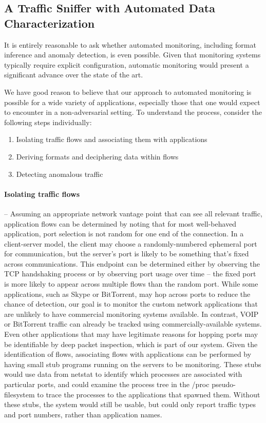 \subsection{A Traffic Sniffer with Automated Data Characterization}

It is entirely reasonable to ask whether automated monitoring,
including format inference and anomaly detection, is even
possible. Given that monitoring systems typically require explicit
configuration, automatic monitoring would present a significant
advance over the state of the art.

We have good reason to believe that our approach to automated
monitoring is possible for a wide variety of applications, especially
those that one would expect to encounter in a non-adversarial setting.
To understand the process, consider the following steps individually:

\begin{enumerate}
\item Isolating traffic flows and associating them with applications
\item Deriving formats and deciphering data within flows
\item Detecting anomalous traffic
\end{enumerate}

\paragraph*{Isolating traffic flows} -- Assuming an appropriate network
vantage point that can see all relevant traffic, application flows can
be determined by noting that for most well-behaved application, port
selection is not random for one end of the connection. In a
client-server model, the client may choose a randomly-numbered
ephemeral port for communication, but the server's port is likely to
be something that's fixed across communications. This endpoint can be
determined either by observing the TCP handshaking process or by
observing port usage over time -- the fixed port is more likely to
appear across multiple flows than the random port. While some
applications, such as Skype or BitTorrent, may hop across ports to
reduce the chance of detection, our goal is to monitor the custom
network applications that are unlikely to have commercial monitoring
systems available. In contrast, VOIP or BitTorrent traffic can already
be tracked using commercially-available systems. Even other
applications that may have legitimate reasons for hopping ports may be
identifiable by deep packet inspection, which is part of our
system. Given the identification of flows, associating flows with
applications can be performed by having small stub programs running on
the servers to be monitoring. These stubs would use data from netstat
to identify which processes are associated with particular ports, and
could examine the process tree in the /proc pseudo-filesystem to trace
the processes to the applications that spawned them. Without these
stubs, the system would still be usable, but could only report traffic
types and port numbers, rather than application names.

